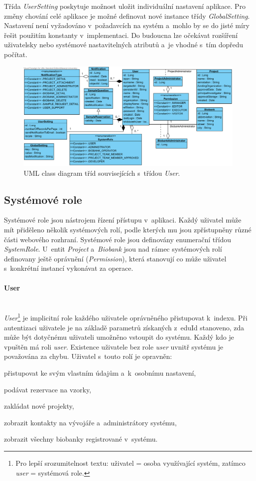 \documentclass[11pt, final, oneside]{fithesis2}
\newcommand{\paragraphNewLine}[1]{\paragraph*{#1}\mbox{}\\}
\begin{document}
Třída \textit{UserSetting} poskytuje možnost uložit individuální nastavení aplikace.
Pro změny chování celé aplikace je možné definovat nové instance třídy \textit{GlobalSetting}. Nastavení není vyžadováno v~požadavcích na systém a~mohlo by se do jisté míry řešit použitím konstanty v~implementaci. Do budoucna lze očekávat rozšíření uživatelsky nebo systémové nastavitelných atributů a~je vhodné s~tím dopředu počítat.

\begin{figure}[h!]
\centering
	\includegraphics[width=\textwidth]{UserView}
\caption{UML class diagram tříd souvisejících s~třídou \textit{User}.}
\label{fig:index:uml:class:user}
\end{figure}

\subsection{Systémové role}
Systémové role jsou nástrojem řízení přístupu v~aplikaci. Každý uživatel může mít přiděleno několik systémových rolí, podle kterých mu jsou zpřístupněny různé části webového rozhraní. Systémové role jsou definovány enumerační třídou \textit{SystemRole}. 
U~entit \textit{Project} a~\textit{Biobank} jsou nad rámec systémových rolí definovany ještě oprávnění (\textit{Permission}), která stanovují co může uživatel s~konkrétní instancí vykonávat za operace.

\paragraphNewLine{User}
\textit{User}\footnote{Pro lepší srozumitelnost textu: uživatel = osoba využívající systém, zatímco \textit{user} = systémová role.} je implicitní role každého uživatele oprávněného přistupovat k~indexu. Při autentizaci uživatele je na základě parametrů získaných z~eduId stanoveno, zda může být dotyčnému uživateli umožněno vstoupit do systému. Každý kdo je vpuštěn má roli \textit{user}. Existence uživatele bez role \textit{user} uvnitř systému je považována za chybu.
Uživatel s~touto rolí je opravněn:
\begin{compactitem}
	\item přistupovat ke svým vlastním údajům a~k~osobnímu nastavení,
	\item podávat rezervace na vzorky,
	\item zakládat nové projekty,
	\item zobrazit kontakty na vývojáře a~administrátory systému,
	\item zobrazit všechny biobanky registrované v~systému.
\end{compactitem}
\end{document}
